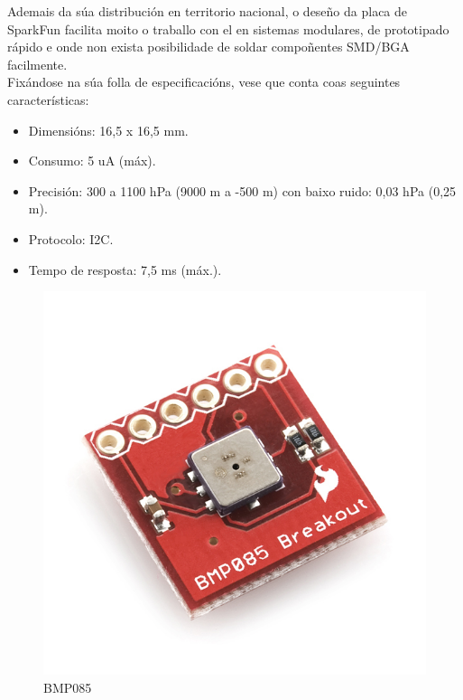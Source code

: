   Ademais da súa distribución en territorio nacional, o deseño da placa de
  SparkFun facilita moito o traballo con el en sistemas modulares, de
  prototipado rápido e onde non exista posibilidade de soldar compoñentes
  SMD/BGA facilmente. \\

  Fixándose na súa folla de especificacións, vese que conta coas seguintes
  características:

  \begin{itemize}
   \item Dimensións: 16,5 x 16,5 mm.
   \item Consumo: 5 uA (máx).
   \item Precisión: 300 a 1100 hPa (9000 m a -500 m) con baixo ruido: 0,03 hPa
         (0,25 m).
   \item Protocolo: I2C.
   \item Tempo de resposta: 7,5 ms (máx.).
  \end{itemize}

  \begin{figure}[htbp]
   \centering
   \includegraphics[keepaspectratio=true]{./imagenes/bmp085.jpg}
   \caption{BMP085}
   \label{figura:BMP085}
  \end{figure}

